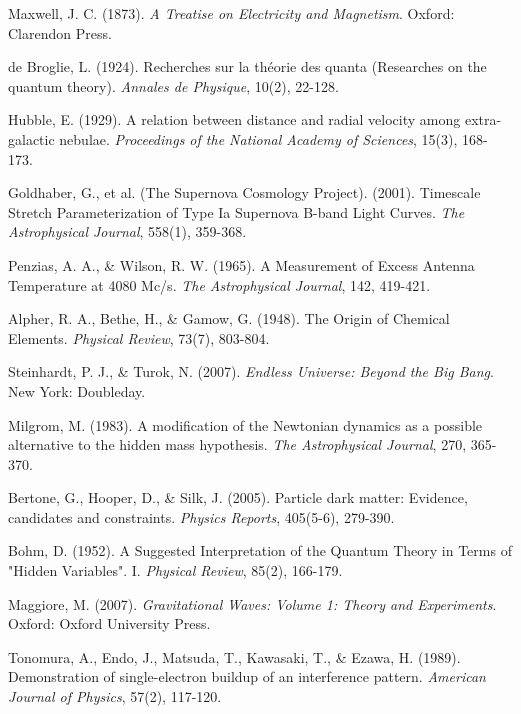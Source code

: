 \documentclass[pdflatex,sn-mathphys-num,referee]{sn-jnl}
\begin{document}
\begin{thebibliography}{99}
Maxwell, J. C. (1873). \textit{A Treatise on Electricity and Magnetism}. Oxford: Clarendon Press.

de Broglie, L. (1924). Recherches sur la théorie des quanta (Researches on the quantum theory). \textit{Annales de Physique}, 10(2), 22-128.

Hubble, E. (1929). A relation between distance and radial velocity among extra-galactic nebulae. \textit{Proceedings of the National Academy of Sciences}, 15(3), 168-173.

Goldhaber, G., et al. (The Supernova Cosmology Project). (2001). Timescale Stretch Parameterization of Type Ia Supernova B-band Light Curves. \textit{The Astrophysical Journal}, 558(1), 359-368.

Penzias, A. A., \& Wilson, R. W. (1965). A Measurement of Excess Antenna Temperature at 4080 Mc/s. \textit{The Astrophysical Journal}, 142, 419-421.

Alpher, R. A., Bethe, H., \& Gamow, G. (1948). The Origin of Chemical Elements. \textit{Physical Review}, 73(7), 803-804.

Steinhardt, P. J., \& Turok, N. (2007). \textit{Endless Universe: Beyond the Big Bang}. New York: Doubleday.

Milgrom, M. (1983). A modification of the Newtonian dynamics as a possible alternative to the hidden mass hypothesis. \textit{The Astrophysical Journal}, 270, 365-370.

Bertone, G., Hooper, D., \& Silk, J. (2005). Particle dark matter: Evidence, candidates and constraints. \textit{Physics Reports}, 405(5-6), 279-390.

Bohm, D. (1952). A Suggested Interpretation of the Quantum Theory in Terms of "Hidden Variables". I. \textit{Physical Review}, 85(2), 166-179.

Maggiore, M. (2007). \textit{Gravitational Waves: Volume 1: Theory and Experiments}. Oxford: Oxford University Press.

Tonomura, A., Endo, J., Matsuda, T., Kawasaki, T., \& Ezawa, H. (1989). Demonstration of single-electron buildup of an interference pattern. \textit{American Journal of Physics}, 57(2), 117-120.


\end{thebibliography}
\end{document}
